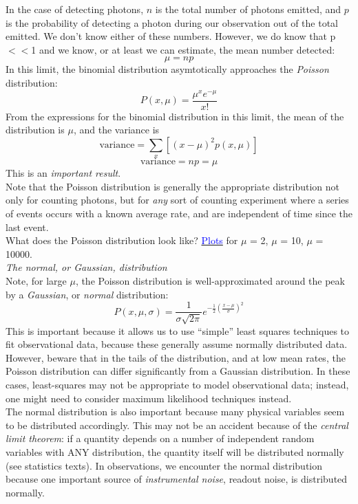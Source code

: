 \documentclass[12pt]{article}
\begin{document}
\noindent In the case of detecting photons, $n$ is the total number of
photons emitted, and $p$ is the probability of detecting a photon during
our observation out of the total emitted. We don't know either of
these numbers. However, we do know that p$<<$1 and we know, or at
least we can estimate, the mean number detected:
  $$  \mu = np $$
In this limit, the binomial distribution asymtotically approaches the
\emph{Poisson} distribution:
   $$  P(x,\mu) = \frac{\mu^x e^{-\mu}}{x!} $$
From the expressions for the binomial distribution in this limit, the
mean of the distribution is $\mu$, and the variance is 
  $$  \textrm{variance} = \sum_x [(x-\mu)^2p(x,\mu)] $$
  $$  \textrm{variance} = np = \mu  $$
This is an \emph{important result}.\\

\noindent Note that the Poisson distribution is generally the
appropriate distribution not only for counting photons, but for 
\emph{any} sort of counting experiment where a series of events
occurs with a known average rate, and are independent of time
since the last event.\\

\noindent What does the Poisson distribution look like?
\href{http://astronomy.nmsu.edu/holtz/a535/html/diagrams/a535/poisson.htm}
{\textcolor{blue}{Plots}}
for $\mu$ = 2, $\mu$ = 10, $\mu$ = 10000.\\

\noindent \emph{The normal, or Gaussian, distribution}\\

\noindent Note, for large $\mu$, the Poisson distribution is
well-approximated around the peak by a \emph{Gaussian}, or
\emph{normal} distribution:
    $$ P(x,\mu,\sigma) = \frac{1}{\sigma\sqrt{2\pi}}
        e^{ -\frac{1}{2} (\frac{x-\mu}{\sigma})^2 }  $$
This is important because it allows us to use ``simple'' least squares
techniques to fit observational data, because these generally assume
normally distributed data. However, beware that in the tails of the
distribution, and at low mean rates, the Poisson distribution can
differ significantly from a Gaussian distribution. In these cases,
least-squares may not be appropriate to model observational data;
instead, one might need to consider maximum likelihood techniques
instead.\\

\noindent The normal distribution is also important because many
physical variables seem to be distributed accordingly. This may not be
an accident because of the \emph{central limit theorem}: if a quantity
depends on a number of independent random variables with ANY
distribution, the quantity itself will be distributed normally (see
statistics texts). In observations, we encounter the normal
distribution because one important source of \emph{instrumental noise},
readout noise, is distributed normally.\\
\end{document}
